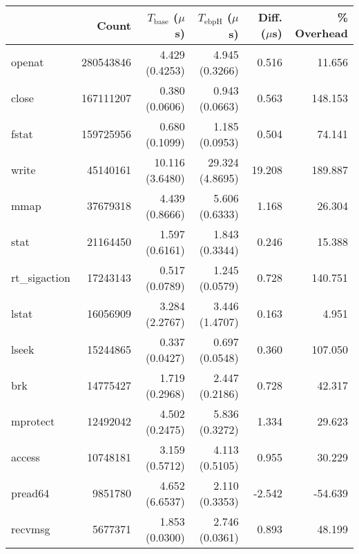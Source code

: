 \begin{tabular}{>{\ttfamily}lrrrrr}
\toprule
\multicolumn{1}{l}{System Call} &      Count & $T_\text{base}$ ($\mu$s) & $T_\text{ebpH}$ ($\mu$s) &  Diff. ($\mu$s) &  \% Overhead \\
\midrule
                         openat &  280543846 &           4.429 (0.4253) &           4.945 (0.3266) &           0.516 &       11.656 \\
                          close &  167111207 &           0.380 (0.0606) &           0.943 (0.0663) &           0.563 &      148.153 \\
                          fstat &  159725956 &           0.680 (0.1099) &           1.185 (0.0953) &           0.504 &       74.141 \\
                          write &   45140161 &          10.116 (3.6480) &          29.324 (4.8695) &          19.208 &      189.887 \\
                           mmap &   37679318 &           4.439 (0.8666) &           5.606 (0.6333) &           1.168 &       26.304 \\
                           stat &   21164450 &           1.597 (0.6161) &           1.843 (0.3344) &           0.246 &       15.388 \\
                  rt\_sigaction &   17243143 &           0.517 (0.0789) &           1.245 (0.0579) &           0.728 &      140.751 \\
                          lstat &   16056909 &           3.284 (2.2767) &           3.446 (1.4707) &           0.163 &        4.951 \\
                          lseek &   15244865 &           0.337 (0.0427) &           0.697 (0.0548) &           0.360 &      107.050 \\
                            brk &   14775427 &           1.719 (0.2968) &           2.447 (0.2186) &           0.728 &       42.317 \\
                       mprotect &   12492042 &           4.502 (0.2475) &           5.836 (0.3272) &           1.334 &       29.623 \\
                         access &   10748181 &           3.159 (0.5712) &           4.113 (0.5105) &           0.955 &       30.229 \\
                        pread64 &    9851780 &           4.652 (6.6537) &           2.110 (0.3353) &          -2.542 &      -54.639 \\
                        recvmsg &    5677371 &           1.853 (0.0300) &           2.746 (0.0361) &           0.893 &       48.199 \\

\end{tabular}
